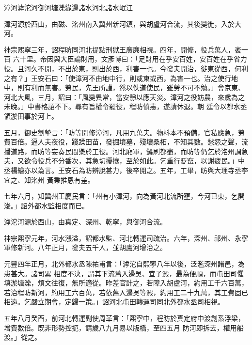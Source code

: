 
\begin{pinyinscope}

 漳河滹沱河御河塘濼緣邊諸水河北諸水岷江



 漳河源於西山，由磁、洺州南入冀州新河鎮，與胡盧河合流，其後變徙，入於大河。



 神宗熙寧三年，詔程昉同河北提點刑獄王廣廉相視。四年，開修，役兵萬人，袤一百
 六十里。帝因與大臣論財用，文彥博曰：「足財用在乎安百姓，安百姓在乎省力役。且河久不開，不出於東，則出於西，利害一也。今發夫開治，徙東從西，何利之有？」王安石曰：「使漳河不由地中行，則或東或西，為害一也。治之使行地中，則有利而無害。勞民，先王所謹，然以佚道使民，雖勞不可不勉。」會京東、河北大風，三月，詔曰：「風變異常，當安靜以應天災。漳河之役妨農，來歲為之未晚。」中書格詔不下。尋有旨權令罷役，程昉憤恚，遂請休退。朝
 廷令以都水丞領淤田事於河上。



 五月，御史劉摯言：「昉等開修漳河，凡用九萬夫。物料本不預備，官私應急，勞費百倍。逼人夫夜役，踐蹂田苗，發掘墳墓，殘壞桑柘，不知其數。愁怨之聲，流播道路，而昉等妄奏民間樂於工役。河北廂軍，鏟刷都盡，而昉等仍乞於洺州調急夫，又欲令役兵不分番次，其急切擾攘，至於如此。乞重行貶竄，以謝疲民。」中丞楊繪亦以為言。王安石為昉辨說甚力，後卒開之。五年，工畢，昉與大理寺丞李宜之、知洺州
 黃秉推恩有差。



 七年六月，知冀州王慶民言：「州有小漳河，向為黃河北流所壅，今河已東，乞開浚。」詔外都水監相度而已。



 滹沱河源於西山，由真定、深州、乾寧，與御河合流。



 神宗熙寧元年，河水漲溢，詔都水監、河北轉運司疏治。六年，深州、祁州、永寧軍修新河。八年正月，發夫五千人，並胡盧河增治之。



 元豐四年正月，北外都水丞陳祐甫言：「滹沱自熙寧八年以後，泛濫深州諸邑，為患甚大。諸司累
 相度不決，謂其下流舊入邊吳、宜子澱，最為便順，而屯田司懼填淤塘濼，煩文往復，無所適從。昨差官計之，若障入胡盧河，約用工千六百萬，若治程昉新河，約用工六百萬，若依舊入邊吳等澱，約用工二十九萬，其工費固已相遠。乞嚴立期會，定歸一策。」詔河北屯田轉運司同北外都水丞司相視。



 五年八月癸酉，前河北轉運副使周革言：「熙寧中，程昉於真定府中渡創系浮梁，增費數倍。既非形勢控扼，請歲八九月易以版橋，至四五月
 防河即拆去，權用船渡。」從之。




\end{pinyinscope}
